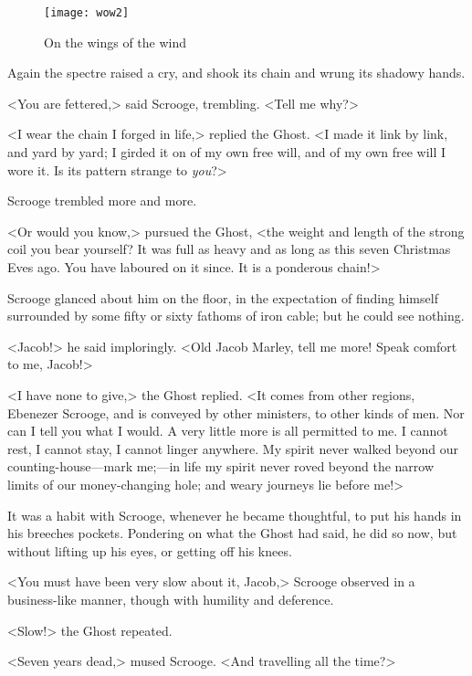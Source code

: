 \begin{letter}
	\begin{figure}[b!]
		\centering
		\texttt{[image: wow2]}
		\caption{On the wings of the wind}
	\end{figure}
\end{letter}


Again the spectre raised a cry, and shook its chain and wrung its shadowy hands.

<You are fettered,> said Scrooge, trembling. <Tell me why?>

<I wear the chain I forged in life,> replied the Ghost. <I made it link by link, and yard by yard; I girded it on of my own free will, and of my own free will I wore it. Is its pattern strange to \textit{you}?>

Scrooge trembled more and more.

<Or would you know,> pursued the Ghost, <the weight and length of the strong coil you bear yourself? It was full as heavy and as long as this seven Christmas Eves ago. You have laboured on it since. It is a ponderous chain!>

Scrooge glanced about him on the floor, in the expectation of finding himself surrounded by some fifty or sixty fathoms of iron cable; but he could see nothing.

<Jacob!> he said imploringly. <Old Jacob Marley, tell me more! Speak comfort to me, Jacob!>


<I have none to give,> the Ghost replied. <It comes from other regions, Ebenezer Scrooge, and is conveyed by other ministers, to other kinds of men. Nor can I tell you what I would. A very little more is all permitted to me. I cannot rest, I cannot stay, I cannot linger anywhere. My spirit never walked beyond our counting-house—mark me;—in life my spirit never roved beyond the narrow limits of our money-changing hole; and weary journeys lie before me!>

It was a habit with Scrooge, whenever he became thoughtful, to put his hands in his breeches pockets. Pondering on what the Ghost had said, he did so now, but without lifting up his eyes, or getting off his knees.

<You must have been very slow about it, Jacob,> Scrooge observed in a business-like manner, though with humility and deference.

<Slow!> the Ghost repeated.

<Seven years dead,> mused Scrooge. <And travelling all the time?>


